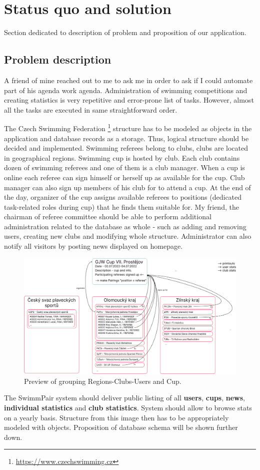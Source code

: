 \chapter{Status quo and solution}
Section dedicated to description of problem and proposition of our application.
\section{Problem description}
\par
A friend of mine reached out to me to ask me in order to ask if I could automate part of his agenda work agenda. Administration of swimming competitions and creating statistics is very repetitive and error-prone list of tasks. However, almost all the tasks are executed in same straightforward order.
\par
The Czech Swimming Federation \footnote{\url{https://www.czechswimming.cz}} structure has to be modeled as objects in the application and database records as a storage. Thus, logical structure should be decided and implemented. Swimming referees belong to clubs, clubs are located in geographical regions. Swimming cup is hosted by club. Each club contains dozen of swimming referees and one of them is a club manager. When a cup is online each referee can sign himself or herself up as available for the cup. Club manager can also sign up members of his club for to attend a cup. At the end of the day, organizer of the cup assigns available referees to positions (dedicated task-related roles during cup) that he finds them suitable for. My friend, the chairman of referee committee should be able to perform additional administration related to the database as whole - such as adding and removing users, creating new clubs and modifying whole structure. Administrator can also notify all visitors by posting news displayed on homepage.
\begin{figure}[h]
\includegraphics[scale=0.335]{img/swimmpair_schema.png}
\caption{Preview of grouping Regions-Clubs-Users and Cup.}
\label{fig1.1:grouping}
\end{figure}
The SwimmPair system should deliver public listing of all \textbf{users}, \textbf{cups}, \textbf{news}, \textbf{individual statistics} and \textbf{club statistics}. System should allow to browse stats on a yearly basis. Structure from this image then has to be appropriately modeled with objects. Proposition of database schema will be shown further down. 
